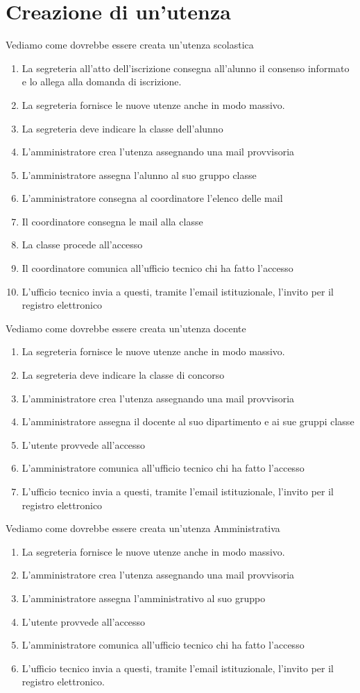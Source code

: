 \documentclass[structure=book,  
pagelayout=standard,defaultfont=cochineal,partialtoc]{suftesi}
\begin{document}
\section{Creazione di un'utenza}
Vediamo come dovrebbe essere creata un'utenza scolastica
\begin{enumerate}
	\item La segreteria all'atto dell'iscrizione consegna all'alunno il consenso
	informato e lo allega alla domanda di iscrizione.
	\item La segreteria fornisce le nuove utenze anche in modo massivo.
	\item La segreteria deve indicare la classe dell'alunno
	\item L'amministratore crea l'utenza assegnando una mail provvisoria
	\item L'amministratore assegna l'alunno al suo gruppo classe
	\item L'amministratore consegna al coordinatore l'elenco delle mail
	\item Il coordinatore  consegna le mail alla classe 
	\item La classe procede all'accesso
	\item Il coordinatore comunica all'ufficio tecnico chi ha fatto l'accesso
	\item L'ufficio tecnico invia  a questi, tramite l'email istituzionale, 
	l'invito  per il registro elettronico
\end{enumerate}
Vediamo come dovrebbe essere creata un'utenza docente
\begin{enumerate}
	\item La segreteria fornisce le nuove utenze anche in modo massivo.
	\item La segreteria deve indicare la classe di concorso
	\item L'amministratore crea l'utenza assegnando una mail provvisoria
	\item L'amministratore assegna il docente al suo dipartimento e ai sue 
	gruppi  classe
	\item L'utente provvede all'accesso
	\item L'amministratore  comunica all'ufficio tecnico chi ha fatto l'accesso
	\item L'ufficio tecnico invia  a questi, tramite l'email istituzionale, 
	l'invito  per il registro elettronico
\end{enumerate}
Vediamo come dovrebbe essere creata un'utenza Amministrativa
\begin{enumerate}
	\item La segreteria fornisce le nuove utenze anche in modo massivo.
	\item L'amministratore crea l'utenza assegnando una mail provvisoria
	\item L'amministratore assegna l'amministrativo al suo gruppo
	\item L'utente provvede all'accesso
	\item L'amministratore  comunica all'ufficio tecnico chi ha fatto l'accesso
	\item L'ufficio tecnico invia  a questi, tramite l'email istituzionale, 
	l'invito  per il registro elettronico.
\end{enumerate}
\end{document}
